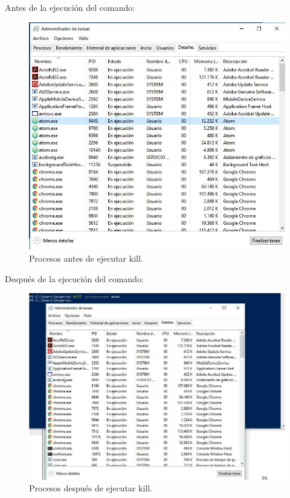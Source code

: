 Antes de la ejecución del comando:
\begin{figure}[H]
	\centering
	\includegraphics[scale=0.75]{before-kill.jpg}
	\caption{Procesos antes de ejecutar kill. \label{fig:figura25}}
\end{figure}
Después de la ejecución del comando:
\begin{figure}[H]
	\centering
	\includegraphics[scale=0.75]{after-kill.jpg}
	\caption{Procesos después de ejecutar kill. \label{fig:figura26}}
\end{figure}


